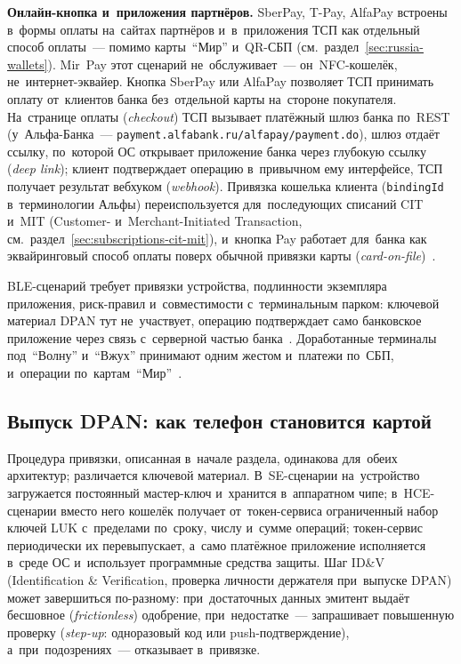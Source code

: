 \textbf{Онлайн-кнопка и~приложения партнёров.} SberPay, T-Pay, AlfaPay встроены
в~формы оплаты на~сайтах партнёров и~в~приложения ТСП как отдельный способ
оплаты~--- помимо карты~\enquote{Мир} и~QR-СБП
(см.~раздел~\ref{sec:russia-wallets}). Mir~Pay этот сценарий не~обслуживает~---
он~NFC-кошелёк, не~интернет-эквайер. Кнопка SberPay или AlfaPay позволяет ТСП
принимать оплату от~клиентов банка без~отдельной карты на~стороне покупателя.
На~странице оплаты (\textit{checkout}) ТСП вызывает платёжный шлюз банка по~REST
(у~Альфа-Банка~--- \texttt{payment.alfabank.ru/alfapay/payment.do}), шлюз отдаёт
ссылку, по~которой ОС открывает приложение банка через глубокую ссылку
(\textit{deep link});
клиент подтверждает операцию в~привычном ему интерфейсе, ТСП получает результат
вебхуком (\textit{webhook}). Привязка кошелька клиента (\texttt{bindingId} в~терминологии Альфы)
переиспользуется для~последующих списаний CIT и~MIT (Customer-
и~Merchant-Initiated Transaction, см.~раздел~\ref{sec:subscriptions-cit-mit}),
и~кнопка Pay работает для~банка как эквайринговый способ оплаты поверх обычной
привязки карты (\textit{card-on-file})~\cite{alfa-pay-web-api-2025}.

BLE-сценарий требует привязки устройства, подлинности экземпляра
приложения, риск-правил и~совместимости с~терминальным парком: ключевой
материал DPAN тут не~участвует, операцию подтверждает само банковское
приложение через связь с~серверной частью
банка~\cite{nspk-volna-integration-2026}. Доработанные терминалы
под~\enquote{Волну} и~\enquote{Вжух} принимают одним жестом и~платежи по~СБП,
и~операции по~картам~\enquote{Мир}~\cite{nspk-volna-demo-2025}.

\subsection*{Выпуск DPAN: как телефон становится картой}

Процедура привязки, описанная в~начале раздела, одинакова для~обеих
архитектур; различается ключевой материал. В~SE-сценарии на~устройство
загружается постоянный мастер-ключ и~хранится в~аппаратном чипе; в~HCE-сценарии
вместо него кошелёк получает от~токен-сервиса ограниченный набор ключей LUK с~пределами
по~сроку, числу и~сумме операций; токен-сервис периодически их перевыпускает, а~само платёжное
приложение исполняется в~среде ОС и~использует программные средства защиты. Шаг ID\&V
(Identification \& Verification, проверка личности держателя при~выпуске DPAN)
может завершиться по-разному: при~достаточных данных эмитент выдаёт бесшовное
(\textit{frictionless}) одобрение, при~недостатке~--- запрашивает повышенную
проверку (\textit{step-up}: одноразовый код или push-подтверждение),
а~при~подозрениях~--- отказывает в~привязке.

